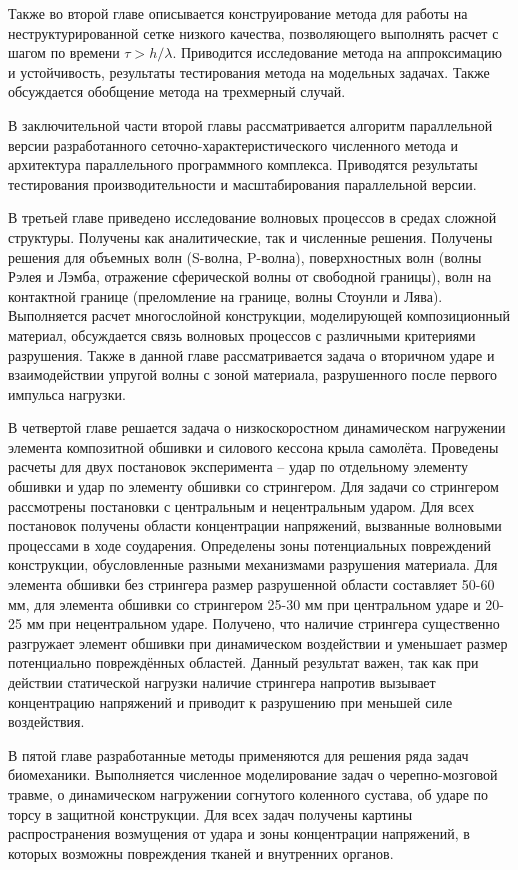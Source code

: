 Также во второй главе описывается конструирование метода для работы на неструктурированной сетке низкого качества, позволяющего выполнять расчет с шагом по времени $\tau > h / \lambda$. Приводится исследование метода на аппроксимацию и устойчивость, результаты тестирования метода на модельных задачах. Также обсуждается обобщение метода на трехмерный случай.

В заключительной части второй главы рассматривается алгоритм параллельной версии разработанного сеточно-характеристического численного метода и архитектура параллельного программного комплекса. Приводятся результаты тестирования производительности и масштабирования параллельной версии.

В третьей главе приведено исследование волновых процессов в средах сложной структуры. Получены как аналитические, так и численные решения. Получены решения для объемных волн (S-волна, P-волна), поверхностных волн (волны Рэлея и Лэмба, отражение сферической волны от свободной границы), волн на контактной границе (преломление на границе, волны Стоунли и Лява). Выполняется расчет многослойной конструкции, моделирующей композиционный материал, обсуждается связь волновых процессов с различными критериями разрушения. Также в данной главе рассматривается задача о вторичном ударе и взаимодействии упругой волны с зоной материала, разрушенного после первого импульса нагрузки.

В четвертой главе решается задача о низкоскоростном динамическом нагружении элемента композитной обшивки и силового кессона крыла самолёта. Проведены расчеты для двух постановок эксперимента -- удар по отдельному элементу обшивки и удар по элементу обшивки со стрингером. Для задачи со стрингером рассмотрены постановки с центральным и нецентральным ударом. Для всех постановок получены области концентрации напряжений, вызванные волновыми процессами в ходе соударения. Определены зоны потенциальных повреждений конструкции, обусловленные разными механизмами разрушения материала. Для элемента обшивки без стрингера размер разрушенной области составляет 50-60 мм, для элемента обшивки со стрингером 25-30 мм при центральном ударе и 20-25 мм при нецентральном ударе. Получено, что наличие стрингера существенно разгружает элемент обшивки при динамическом воздействии и уменьшает размер потенциально повреждённых областей. Данный результат важен, так как при действии статической нагрузки наличие стрингера напротив вызывает концентрацию напряжений и приводит к разрушению при меньшей силе воздействия.

В пятой главе разработанные методы применяются для решения ряда задач биомеханики. Выполняется численное моделирование задач о черепно-мозговой травме, о динамическом нагружении согнутого коленного сустава, об ударе по торсу в защитной конструкции. Для всех задач получены картины распространения возмущения от удара и зоны концентрации напряжений, в которых возможны повреждения тканей и внутренних органов.

